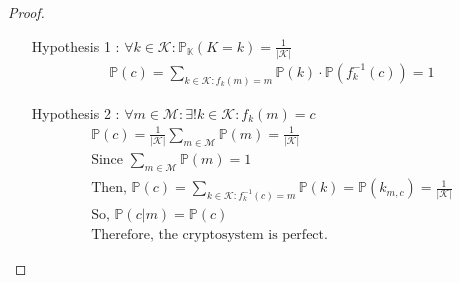 \begin{proof}
\begin{itemize}
\begin{itemize}
            \item[Hypothesis 1]: $\forall k \in \mathcal{K}: \mathbb{P}_{\mathbb{K}}(K = k) = \frac{1}{|\mathcal{K}|}$
            \noindent
            \begin{gather*}
                \mathbb{P}(c) = \sum_{k \in \mathcal{K}: f_{k}(m) = m} \mathbb{P}(k) \cdot \mathbb{P}(f_{k}^{-1}(c)) = 1
            \end{gather*}
            \item[Hypothesis 2]: $\forall m \in \mathcal{M}: \exists ! k \in \mathcal{K}: f_{k}(m) = c$
            \noindent
            \begin{gather*}
                \mathbb{P}(c) = \frac{1}{|\mathcal{K}|}\sum_{m \in \mathcal{M}} \mathbb{P}(m) = \frac{1}{|\mathcal{K}|}\\
                \text{Since } \sum_{m \in \mathcal{M}} \mathbb{P}(m) = 1\\
                \text{Then, } \mathbb{P}(c) = \sum_{k \in \mathcal{K}: f_{k}^{-1}(c) = m} \mathbb{P}(k) = \mathbb{P}(k_{m,c}) = \frac{1}{|\mathcal{K}|}\\
                \text{So, }\mathbb{P}(c|m) = \mathbb{P}(c)\\
                \text{Therefore, the cryptosystem is perfect.}
            \end{gather*}
        \end{itemize}
    \end{itemize}
\end{proof}

